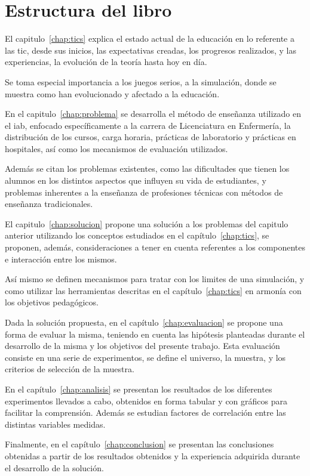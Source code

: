 \section{Estructura del libro}

El capitulo~\ref{chap:tics} explica el estado actual de la educación en lo
referente a las \Gls{tic}, desde sus inicios, las expectativas creadas, los
progresos realizados, y las experiencias, la evolución de la teoría hasta hoy en
día.

Se toma especial importancia a los juegos serios, a la simulación, donde se
muestra como han evolucionado y afectado a la educación.


En el capitulo~\ref{chap:problema} se desarrolla el método de enseñanza utilizado
en el \Gls{iab}, enfocado específicamente a la carrera de Licenciatura en
Enfermería, la distribución de los cursos, carga horaria, prácticas de
laboratorio y prácticas en hospitales, así como los mecanismos de evaluación
utilizados.

Además se citan los problemas existentes, como las dificultades que tienen los
alumnos en los distintos aspectos que influyen su vida de estudiantes, y
problemas inherentes a la enseñanza de profesiones técnicas con métodos de
enseñanza tradicionales.


El capitulo~\ref{chap:solucion} propone una solución a los problemas del
capitulo anterior utilizando los conceptos estudiados en el
capítulo~\ref{chap:tics}, se proponen, además, consideraciones a tener en
cuenta referentes a los componentes e interacción entre los mismos.

Así mismo se definen mecanismos para tratar con los limites de una simulación, y
como utilizar las herramientas descritas en el capítulo~\ref{chap:tics} en
armonía con los objetivos pedagógicos.


Dada la solución propuesta, en el capítulo~\ref{chap:evaluacion} se propone una
forma de evaluar la misma, teniendo en cuenta las hipótesis planteadas durante
el desarrollo de la misma y los objetivos del presente trabajo. Esta evaluación
consiste en una serie de experimentos, se define el universo, la muestra, y los
criterios de selección de la muestra.


En el capítulo~\ref{chap:analisis} se presentan los resultados de los diferentes
experimentos llevados a cabo, obtenidos en forma tabular y con gráficos para
facilitar la comprensión. Además se estudian factores de correlación entre las
distintas variables medidas.


Finalmente, en el capítulo~\ref{chap:conclusion} se presentan las conclusiones
obtenidas a partir de los resultados obtenidos y la experiencia adquirida
durante el desarrollo de la solución.
